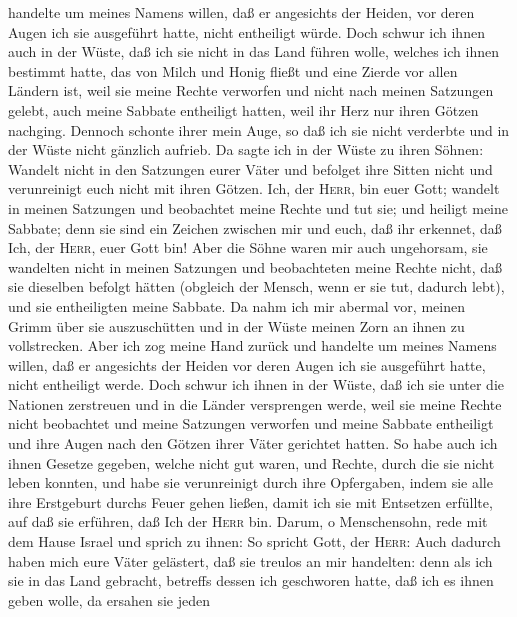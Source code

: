 handelte um meines Namens willen, daß er angesichts der Heiden, vor
deren Augen ich sie ausgeführt hatte, nicht entheiligt würde.
 Doch schwur ich ihnen auch in der Wüste, daß ich sie
nicht in das Land führen wolle, welches ich ihnen bestimmt hatte, das
von Milch und Honig fließt und eine Zierde vor allen Ländern ist,
 weil sie meine Rechte verworfen und nicht nach meinen
Satzungen gelebt, auch meine Sabbate entheiligt hatten, weil ihr Herz
nur ihren Götzen nachging.  Dennoch schonte ihrer mein
Auge, so daß ich sie nicht verderbte und in der Wüste nicht gänzlich
aufrieb.  Da sagte ich in der Wüste zu ihren Söhnen:
Wandelt nicht in den Satzungen eurer Väter und befolget ihre Sitten
nicht und verunreinigt euch nicht mit ihren Götzen.  Ich,
der \textsc{Herr}, bin euer Gott; wandelt in meinen Satzungen und
beobachtet meine Rechte und tut sie;  und heiligt meine
Sabbate; denn sie sind ein Zeichen zwischen mir und euch, daß ihr
erkennet, daß Ich, der \textsc{Herr}, euer Gott bin! 
Aber die Söhne waren mir auch ungehorsam, sie wandelten nicht in meinen
Satzungen und beobachteten meine Rechte nicht, daß sie dieselben befolgt
hätten (obgleich der Mensch, wenn er sie tut, dadurch lebt), und sie
entheiligten meine Sabbate. Da nahm ich mir abermal vor, meinen Grimm
über sie auszuschütten und in der Wüste meinen Zorn an ihnen zu
vollstrecken.  Aber ich zog meine Hand zurück und
handelte um meines Namens willen, daß er angesichts der Heiden vor deren
Augen ich sie ausgeführt hatte, nicht entheiligt werde. 
Doch schwur ich ihnen in der Wüste, daß ich sie unter die Nationen
zerstreuen und in die Länder versprengen werde,  weil sie
meine Rechte nicht beobachtet und meine Satzungen verworfen und meine
Sabbate entheiligt und ihre Augen nach den Götzen ihrer Väter gerichtet
hatten.  So habe auch ich ihnen Gesetze gegeben, welche
nicht gut waren, und Rechte, durch die sie nicht leben konnten,
 und habe sie verunreinigt durch ihre Opfergaben, indem
sie alle ihre Erstgeburt durchs Feuer gehen ließen, damit ich sie mit
Entsetzen erfüllte, auf daß sie erführen, daß Ich der \textsc{Herr} bin.
 Darum, o Menschensohn, rede mit dem Hause Israel und
sprich zu ihnen: So spricht Gott, der \textsc{Herr}: Auch dadurch haben
mich eure Väter gelästert, daß sie treulos an mir handelten:
 denn als ich sie in das Land gebracht, betreffs dessen
ich geschworen hatte, daß ich es ihnen geben wolle, da ersahen sie jeden
